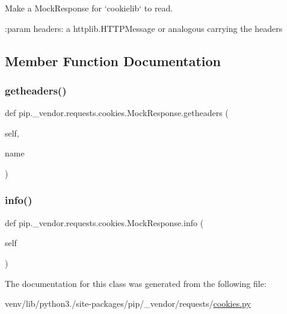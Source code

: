 \begin{DoxyVerb}Make a MockResponse for `cookielib` to read.

:param headers: a httplib.HTTPMessage or analogous carrying the headers
\end{DoxyVerb}
 

\subsection{Member Function Documentation}
\mbox{\label{classpip_1_1__vendor_1_1requests_1_1cookies_1_1MockResponse_a05847552ba8ec8f478c3aae7d902c7a6}} 
\subsubsection{\texorpdfstring{getheaders()}{getheaders()}}
{\footnotesize\ttfamily def pip.\+\_\+vendor.\+requests.\+cookies.\+Mock\+Response.\+getheaders (\begin{DoxyParamCaption}\item[{}]{self,  }\item[{}]{name }\end{DoxyParamCaption})}

\mbox{\label{classpip_1_1__vendor_1_1requests_1_1cookies_1_1MockResponse_a6057235d2da9c755a933bb53334868cc}} 
\subsubsection{\texorpdfstring{info()}{info()}}
{\footnotesize\ttfamily def pip.\+\_\+vendor.\+requests.\+cookies.\+Mock\+Response.\+info (\begin{DoxyParamCaption}\item[{}]{self }\end{DoxyParamCaption})}



The documentation for this class was generated from the following file\+:\begin{DoxyCompactItemize}
\item 
venv/lib/python3./site-\/packages/pip/\+\_\+vendor/requests/\hyperlink{cookies_8py}{cookies.\+py}\end{DoxyCompactItemize}
